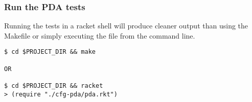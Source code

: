 \subsubsection{Run the PDA tests}\label{run-the-pda-tests}

Running the tests in a racket shell will produce cleaner output than
using the Makefile or simply executing the file from the command line.

\begin{verbatim}
$ cd $PROJECT_DIR && make

OR

$ cd $PROJECT_DIR && racket
> (require "./cfg-pda/pda.rkt")
\end{verbatim}
